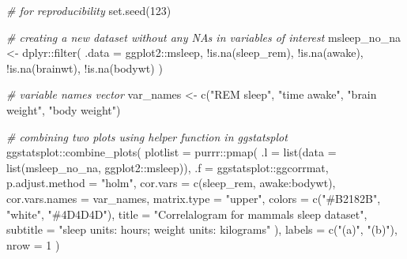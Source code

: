 \documentclass[
]{article}
\newenvironment{Shaded}{\begin{snugshade}}{\end{snugshade}}
\newcommand{\AttributeTok}[1]{\textcolor[rgb]{0.77,0.63,0.00}{#1}}
\newcommand{\CommentTok}[1]{\textcolor[rgb]{0.56,0.35,0.01}{\textit{#1}}}
\newcommand{\DecValTok}[1]{\textcolor[rgb]{0.00,0.00,0.81}{#1}}
\newcommand{\FunctionTok}[1]{\textcolor[rgb]{0.00,0.00,0.00}{#1}}
\newcommand{\NormalTok}[1]{#1}
\newcommand{\OtherTok}[1]{\textcolor[rgb]{0.56,0.35,0.01}{#1}}
\newcommand{\SpecialCharTok}[1]{\textcolor[rgb]{0.00,0.00,0.00}{#1}}
\newcommand{\StringTok}[1]{\textcolor[rgb]{0.31,0.60,0.02}{#1}}
\begin{document}
\begin{Shaded}
\begin{Highlighting}[]
\CommentTok{\# for reproducibility}
\FunctionTok{set.seed}\NormalTok{(}\DecValTok{123}\NormalTok{)}

\CommentTok{\# creating a new dataset without any NAs in variables of interest}
\NormalTok{msleep\_no\_na }\OtherTok{\textless{}{-}}
\NormalTok{  dplyr}\SpecialCharTok{::}\FunctionTok{filter}\NormalTok{(}
    \AttributeTok{.data =}\NormalTok{ ggplot2}\SpecialCharTok{::}\NormalTok{msleep,}
    \SpecialCharTok{!}\FunctionTok{is.na}\NormalTok{(sleep\_rem), }\SpecialCharTok{!}\FunctionTok{is.na}\NormalTok{(awake), }\SpecialCharTok{!}\FunctionTok{is.na}\NormalTok{(brainwt), }\SpecialCharTok{!}\FunctionTok{is.na}\NormalTok{(bodywt)}
\NormalTok{  )}

\CommentTok{\# variable names vector}
\NormalTok{var\_names }\OtherTok{\textless{}{-}} \FunctionTok{c}\NormalTok{(}\StringTok{"REM sleep"}\NormalTok{, }\StringTok{"time awake"}\NormalTok{, }\StringTok{"brain weight"}\NormalTok{, }\StringTok{"body weight"}\NormalTok{)}

\CommentTok{\# combining two plots using helper function in \textasciigrave{}ggstatsplot\textasciigrave{}}
\NormalTok{ggstatsplot}\SpecialCharTok{::}\FunctionTok{combine\_plots}\NormalTok{(}
  \AttributeTok{plotlist =}\NormalTok{ purrr}\SpecialCharTok{::}\FunctionTok{pmap}\NormalTok{(}
    \AttributeTok{.l =} \FunctionTok{list}\NormalTok{(}\AttributeTok{data =} \FunctionTok{list}\NormalTok{(msleep\_no\_na, ggplot2}\SpecialCharTok{::}\NormalTok{msleep)),}
    \AttributeTok{.f =}\NormalTok{ ggstatsplot}\SpecialCharTok{::}\NormalTok{ggcorrmat,}
    \AttributeTok{p.adjust.method =} \StringTok{"holm"}\NormalTok{,}
    \AttributeTok{cor.vars =} \FunctionTok{c}\NormalTok{(sleep\_rem, awake}\SpecialCharTok{:}\NormalTok{bodywt),}
    \AttributeTok{cor.vars.names =}\NormalTok{ var\_names,}
    \AttributeTok{matrix.type =} \StringTok{"upper"}\NormalTok{,}
    \AttributeTok{colors =} \FunctionTok{c}\NormalTok{(}\StringTok{"\#B2182B"}\NormalTok{, }\StringTok{"white"}\NormalTok{, }\StringTok{"\#4D4D4D"}\NormalTok{),}
    \AttributeTok{title =} \StringTok{"Correlalogram for mammals sleep dataset"}\NormalTok{,}
    \AttributeTok{subtitle =} \StringTok{"sleep units: hours; weight units: kilograms"}
\NormalTok{  ),}
  \AttributeTok{labels =} \FunctionTok{c}\NormalTok{(}\StringTok{"(a)"}\NormalTok{, }\StringTok{"(b)"}\NormalTok{),}
  \AttributeTok{nrow =} \DecValTok{1}
\NormalTok{)}
\end{Highlighting}
\end{Shaded}
\end{document}

